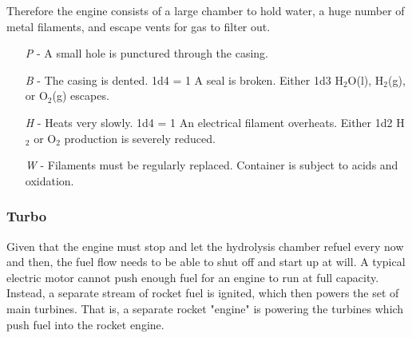 \documentclass[a4paper]{article}
\begin{document}
Therefore the engine consists of a large chamber to hold water, a huge number of metal filaments, and escape vents for gas to filter out.

\begin{enumerate}
\item [\textit{P}] - A small hole is punctured through the casing. \newline 
\hspace*{3pt}  \\
\item [\textit{B}] - The casing is dented. \newline \hspace*{3pt} 1d4 = 1 A seal is broken. Either 1d3 H$_2$O(l), H$_2$(g), or O$_2$(g) escapes.
\item [\textit{H}] - Heats very slowly. \newline \hspace*{3pt} 1d4 = 1 An electrical filament overheats. Either 1d2 H$_2$ or O$_2$ production is severely reduced.
\item [\textit{W}] - Filaments must be regularly replaced. Container is subject to acids and oxidation.
\end{enumerate}

\vspace{-0.5cm} \hspace{-18pt} \subsubsection{Turbo} \label{engine_turbo} \vspace{-0.2cm}
Given that the engine must stop and let the hydrolysis chamber refuel every now and then, the fuel flow needs to be able to shut off and start up at will. A typical electric motor cannot push enough fuel for an engine to run at full capacity. Instead, a separate stream of rocket fuel is ignited, which then powers the set of main turbines. That is, a separate rocket "engine" is powering the turbines which push fuel into the rocket engine. 
\end{document}

